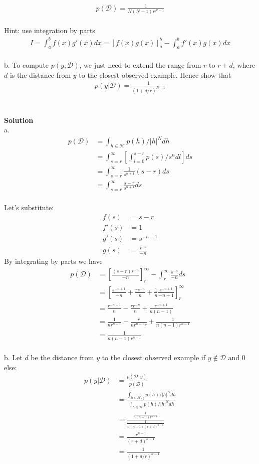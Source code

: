\begin{align*}
p(\mathcal{D}) = \frac{1}{N(N-1)r^{N-1}} 
\end{align*}
\\
Hint: use integration by parts
\begin{align*}
I = \int_{a}^{b} f(x)g'(x)dx = [f(x)g(x)]_a^b - \int_a^b f'(x)g(x)dx
\end{align*}
\\
b. To compute $p(y, \mathcal{D})$, we just need to extend the range from $r$ to $r + d$, where $d$ is the distance from $y$ to
the closest observed example. Hence show that
\begin{align*}
p(y|\mathcal{D}) = \frac{1}{(1+d/r)^{N-1}}
\end{align*}
\\ \\
\textbf{Solution} \\
a.
\begin{align*}
p(\mathcal{D}) &= \int_{h \in \mathcal{H}}p(h)/|h|^Ndh \\
&= \int_{s=r}^{\infty}\left[\int_{l=0}^{s-r}p(s)/s^ndl\right]ds \\
&= \int_{s=r}^{\infty}\frac{1}{s^{n+1}}(s-r)ds \\
&= \int_{s=r}^{\infty}\frac{s-r}{s^{n+1}}ds
\end{align*}
\\
Let's substitute: 
\begin{align*}
    f(s) &= s - r \\
    f'(s) &= 1 \\
    g'(s) &= s^{-n-1} \\
    g(s) &= \frac{s^{-n}}{-n}
\end{align*}
By integrating by parts we have
\begin{align*}
    p(\mathcal{D}) &= \left[\frac{(s-r)s^{-n}}{-n}\right]_r^\infty - \int_r^\infty \frac{s^{-n}}{-n}ds \\
    &= \left[\frac{s^{-n+1}}{-n} + \frac{rs^{-n}}{n} + \frac{1}{n}\frac{s^{-n+1}}{-n+1}\right]_r^\infty \\
    &= \frac{r^{-n+1}}{n} - \frac{rr^{-n}}{n} + \frac{r^{-n+1}}{n(n-1)} \\
    &= \frac{1}{nr^{n-1}} - \frac{r}{nr^{n-1}r} + \frac{1}{n(n-1)r^{n-1}} \\
    &= \frac{1}{n(n-1)r^{n-1}}
\end{align*} \\
b. Let $d$ be the distance from $y$ to the closest observed example if $y \notin \mathcal{D}$ and $0$ else:
\begin{align*}
p(y|\mathcal{D}) &= \frac{p(\mathcal{D}, y)}{p(\mathcal{D})} \\
&= \frac{\int_{h \in \mathcal{H}, y}p(h)/|h|^Ndh}{\int_{h \in \mathcal{H}}p(h)/|h|^Ndh} \\
&= \frac{\frac{1}{n(n-1)r^{n-1}}}{\frac{1}{n(n-1)(r+d)^{n-1}}} \\
&= \frac{r^{n-1}}{(r+d)^{n-1}} \\
&= \frac{1}{(1 + d/r)^{n-1}}
\end{align*}